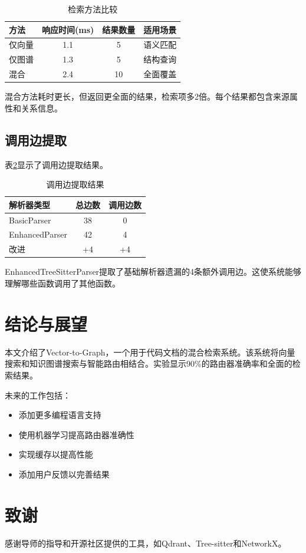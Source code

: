 \documentclass[11pt]{article}
\begin{document}
\begin{table}[htbp]
\centering
\caption{检索方法比较}
\label{tab:retrieval_metrics}
\begin{tabular}{lccc}
\toprule
方法 & 响应时间(ms) & 结果数量 & 适用场景 \\
\midrule
仅向量 & 1.1 & 5 & 语义匹配 \\
仅图谱 & 1.3 & 5 & 结构查询 \\
混合 & 2.4 & 10 & 全面覆盖 \\
\bottomrule
\end{tabular}
\end{table}

混合方法耗时更长，但返回更全面的结果，检索项多2倍。每个结果都包含来源属性和关系信息。

\subsection{调用边提取}
表\ref{tab:call_edges}显示了调用边提取结果。

\begin{table}[htbp]
\centering
\caption{调用边提取结果}
\label{tab:call_edges}
\begin{tabular}{lcc}
\toprule
解析器类型 & 总边数 & 调用边数 \\
\midrule
BasicParser & 38 & 0 \\
EnhancedParser & 42 & 4 \\
改进 & +4 & +4 \\
\bottomrule
\end{tabular}
\end{table}

EnhancedTreeSitterParser提取了基础解析器遗漏的4条额外调用边。这使系统能够理解哪些函数调用了其他函数。

\section{结论与展望}

本文介绍了Vector-to-Graph，一个用于代码文档的混合检索系统。该系统将向量搜索和知识图谱搜索与智能路由相结合。实验显示90\%的路由器准确率和全面的检索结果。

未来的工作包括：

\begin{itemize}
    \item 添加更多编程语言支持
    \item 使用机器学习提高路由器准确性
    \item 实现缓存以提高性能
    \item 添加用户反馈以完善结果
\end{itemize}

\section{致谢}
感谢导师的指导和开源社区提供的工具，如Qdrant、Tree-sitter和NetworkX。



\end{document}
